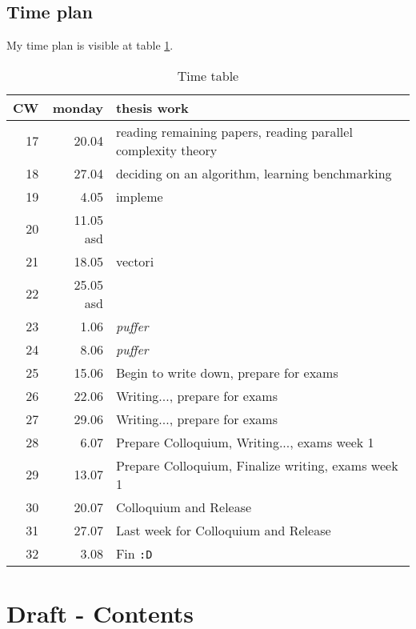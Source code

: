 \documentclass{article}
\begin{document}
    \subsection{Time plan}
    My time plan is visible at table \ref{timetable}.
    \begin{table}[h]
        \begin{center}
        \caption{Time table} %
        \label{timetable}
        \begin{tabular}{rrl}
            \toprule
            CW & monday & thesis work \\
            \midrule
            17 & 20.04 & reading remaining papers, reading parallel complexity theory \\
            18 & 27.04 & deciding on an algorithm, learning benchmarking  \\
            19 & 4.05  & impleme \\
            20 & 11.05  asd \\
            21 & 18.05 & vectori \\
            22 & 25.05 asd \\
            23 & 1.06  & \textit{puffer} \\
            24 & 8.06  & \textit{puffer} \\
            25 & 15.06 & Begin to write down, prepare for exams\\
            26 & 22.06 & Writing..., prepare for exams \\
            27 & 29.06 & Writing..., prepare for exams \\
            28 & 6.07  & Prepare Colloquium, Writing..., exams week 1 \\
            29 & 13.07 & Prepare Colloquium, Finalize writing, exams week 1 \\
            30 & 20.07 & Colloquium and Release \\
            31 & 27.07 & Last week for Colloquium and Release \\
            32 & 3.08  & Fin \texttt{:D} \\
        \end{tabular}
        \end{center}
    \end{table}

    \section{Draft - Contents}
\end{document}
